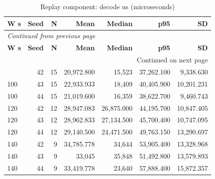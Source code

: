 \documentclass[10pt,a4paper]{article}
\begin{document}
\begingroup\small\setlength{\tabcolsep}{4pt}\renewcommand{\arraystretch}{1.12}
\begin{longtable}{@{}lrrrrrr@{}}
\caption{Replay component:\allowbreak{} decode us (microseconds)}\\
\toprule
\textbf{W s} & \textbf{Seed} & \textbf{N} & \textbf{Mean} & \textbf{Median} & \textbf{p95} & \textbf{SD} \\
\midrule\endfirsthead
\multicolumn{7}{l}{\small\itshape Continued from previous page}\\
\toprule
\textbf{W s} & \textbf{Seed} & \textbf{N} & \textbf{Mean} & \textbf{Median} & \textbf{p95} & \textbf{SD} \\
\midrule\endhead
\midrule\multicolumn{7}{r}{\small Continued on next page}\\\endfoot
\bottomrule\endlastfoot
100 & 42 & 15 & 20,972.800 & 15,523 & 37,262.100 & 9,338.630 \\
100 & 43 & 15 & 22,933.933 & 18,409 & 40,405.900 & 10,201.231 \\
100 & 44 & 15 & 21,019.600 & 16,359 & 38,622.700 & 9,460.743 \\
120 & 42 & 12 & 28,947.083 & 26,875.000 & 44,195.700 & 10,847.405 \\
120 & 43 & 12 & 28,962.833 & 27,134.500 & 45,700.400 & 10,747.095 \\
120 & 44 & 12 & 29,140.500 & 24,471.500 & 49,763.150 & 13,290.697 \\
140 & 42 & 9 & 34,785.778 & 34,644 & 53,905.400 & 13,328.968 \\
140 & 43 & 9 & 33,045 & 35,848 & 51,492.800 & 13,579.893 \\
140 & 44 & 9 & 33,419.778 & 23,640 & 57,888.400 & 15,872.357 \\
\end{longtable}\endgroup
\begingroup\small\setlength{\tabcolsep}{4pt}\renewcommand{\arraystretch}{1.12}
\end{document}

